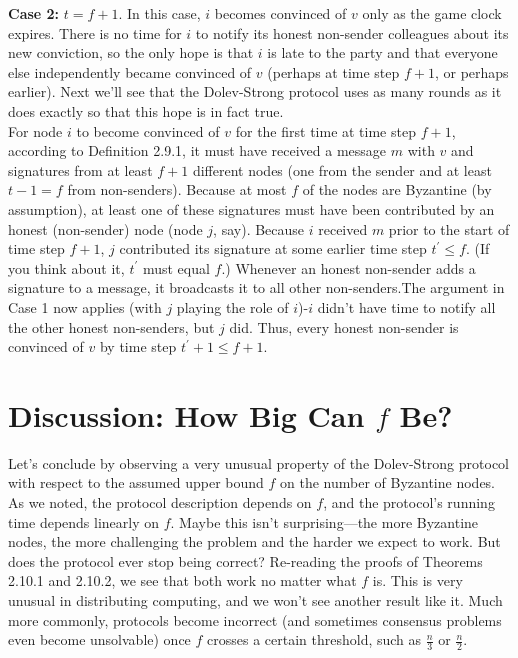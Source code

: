 {\begin{myproof}
\noindent
\textbf{Case 2:} $t = f + 1$. In this case, $i$ becomes convinced of $v$ only as the game clock expires.
There is no time for $i$ to notify its honest non-sender colleagues about its new conviction,
so the only hope is that $i$ is late to the party and that everyone else independently became
convinced of $v$ (perhaps at time step $f + 1$, or perhaps earlier). Next we’ll see that the
Dolev-Strong protocol uses as many rounds as it does exactly so that this hope is in fact
true.\\
For node $i$ to become convinced of $v$ for the first time at time step $f + 1$, according to
Definition 2.9.1, it must have received a message $m$ with $v$ and signatures from at least $f + 1$
different nodes (one from the sender and at least $t - 1 = f$ from non-senders). Because at
most $f$ of the nodes are Byzantine (by assumption), at least one of these signatures must have
been contributed by an honest (non-sender) node (node $j$, say). Because $i$ received $m$ prior
to the start of time step $f + 1$, $j$ contributed its signature at some earlier time step $t^{'} \leq f$.
(If you think about it, $t^{'}$ must equal $f$.) Whenever an honest non-sender adds a signature
to a message, it broadcasts it to all other non-senders.The argument in Case 1 now applies
(with $j$ playing the role of $i$)-$i$ didn't have time to notify all the other honest non-senders,
but $j$ did. Thus, every honest non-sender is convinced of $v$ by time step $t^{'} + 1 \leq f + 1$.
\end{myproof}
}

\newpage
\section{ Discussion: How Big Can $f$ Be?}
Let’s conclude by observing a very unusual property of the Dolev-Strong protocol with
respect to the assumed upper bound $f$ on the number of Byzantine nodes. As we noted, the
protocol description depends on $f$, and the protocol’s running time depends linearly on $f$.
Maybe this isn't surprising—the more Byzantine nodes, the more challenging the problem
and the harder we expect to work. But does the protocol ever stop being correct?
Re-reading the proofs of Theorems 2.10.1 and 2.10.2, we see that both work no matter what $f$
is. This is very unusual in distributing computing, and we won’t see another result like it.
Much more commonly, protocols become incorrect (and sometimes consensus problems even
become unsolvable) once $f$ crosses a certain threshold, such as $\frac{n}{3}$ or $\frac{n}{2}$.\\

